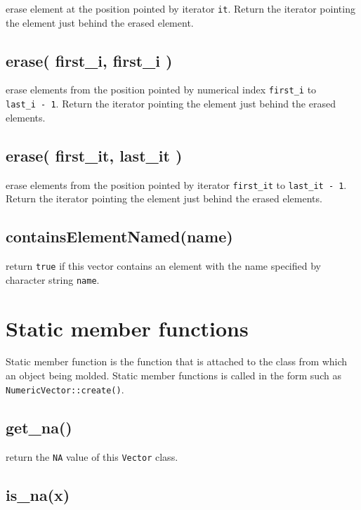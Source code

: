 \documentclass[]{book}
\theoremstyle{definition}
\theoremstyle{definition}
\theoremstyle{remark}
\begin{document}
erase element at the position pointed by iterator \texttt{it}. Return
the iterator pointing the element just behind the erased element.

\subsection{erase( first\_i, first\_i )}\label{erase-first_i-first_i}

erase elements from the position pointed by numerical index
\texttt{first\_i} to \texttt{last\_i\ -\ 1}. Return the iterator
pointing the element just behind the erased elements.

\subsection{erase( first\_it, last\_it )}\label{erase-first_it-last_it}

erase elements from the position pointed by iterator \texttt{first\_it}
to \texttt{last\_it\ -\ 1}. Return the iterator pointing the element
just behind the erased elements.

\subsection{containsElementNamed(name)}\label{containselementnamedname}

return \texttt{true} if this vector contains an element with the name
specified by character string \texttt{name}.

\section{Static member functions}\label{static-member-functions}

Static member function is the function that is attached to the class
from which an object being molded. Static member functions is called in
the form such as \texttt{NumericVector::create()}.

\subsection{get\_na()}\label{get_na}

return the \texttt{NA} value of this \texttt{Vector} class.

\subsection{is\_na(x)}\label{is_nax}
\end{document}
